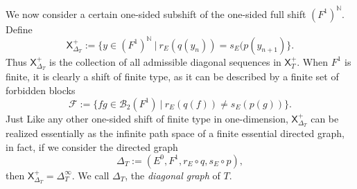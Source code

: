 \documentclass[a4paper,reqno,12pt]{amsart}
\theoremstyle{definition}
\theoremstyle{remark}
\begin{document}
We now consider a certain one-sided subshift of the one-sided full shift $(F^1)^\mathbb{N}$. Define \[\mathsf{X}_{\Delta_T}^+:=\{y\in (F^1)^\mathbb{N}~|~r_E(q(y_n))=s_E(p(y_{n+1})\}.\] Thus $\mathsf{X}_{\Delta_T}^+$ is the collection of all admissible diagonal sequences in $\mathsf{X}_T^+$. When $F^1$ is finite, it is clearly a shift of finite type, as it can be described by a finite set of forbidden blocks \[\mathcal{F}:=\{fg\in \mathcal{B}_2(F^1)~|~r_E(q(f))\neq s_E(p(g))\}.\] Just Like any other one-sided shift of finite type in one-dimension, $\mathsf{X}_{\Delta_T}^+$ can be realized essentially as the infinite path space of a finite essential directed graph, in fact, if we consider the directed graph \[\Delta_T:=(E^0,F^1,r_E\circ q, s_E\circ p),\] then $\mathsf{X}_{\Delta_T}^+=\Delta_T^\infty$. We call $\Delta_T$, the \emph{diagonal graph} of $T$.  
\end{document}
